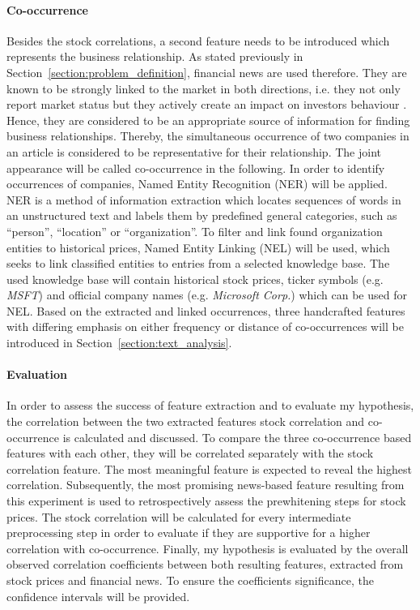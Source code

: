 \paragraph{Co-occurrence}
Besides the stock correlations, a second feature needs to be introduced which represents the business relationship. As stated previously in Section~\ref{section:problem_definition}, financial news are used therefore. They are known to be strongly linked to the market in both directions, i.e. they not only report market status but they actively create an impact on investors behaviour \cite{KhadjehNassirtoussi2014TextReview}. Hence, they are considered to be an appropriate source of information for finding business relationships. Thereby, the simultaneous occurrence of two companies in an article is considered to be representative for their relationship. The joint appearance will be called co-occurrence in the following. In order to identify occurrences of companies, Named Entity Recognition (NER) will be applied. NER is a method of information extraction which locates sequences of words in an unstructured text and labels them by predefined general categories, such as \enquote{person}, \enquote{location} or \enquote{organization}. To filter and link found organization entities to historical prices, Named Entity Linking (NEL) will be used, which seeks to link classified entities to entries from a selected knowledge base. The used knowledge base will contain historical stock prices, ticker symbols (e.g. \emph{MSFT}) and official company names (e.g. \emph{Microsoft Corp.}) which can be used for NEL. Based on the extracted and linked occurrences, three handcrafted features with differing emphasis on either frequency or distance of co-occurrences will be introduced in Section~\ref{section:text_analysis}.

\paragraph{Evaluation}
In order to assess the success of feature extraction and to evaluate my hypothesis, the correlation between the two extracted features stock correlation and co-occurrence is calculated and discussed. To compare the three co-occurrence based features with each other, they will be correlated separately with the stock correlation feature. The most meaningful feature is expected to reveal the highest correlation. Subsequently, the most promising news-based feature resulting from this experiment is used to retrospectively assess the prewhitening steps for stock prices. The stock correlation will be calculated for every intermediate preprocessing step in order to evaluate if they are supportive for a higher correlation with co-occurrence. Finally, my hypothesis is evaluated by the overall observed correlation coefficients between both resulting features, extracted from stock prices and financial news. To ensure the coefficients significance, the confidence intervals will be provided.

